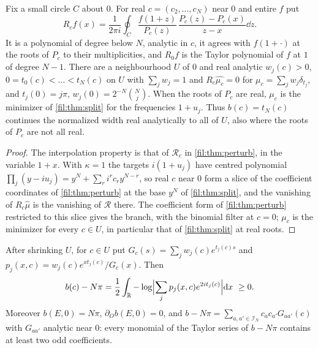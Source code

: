 \begin{lemma}\label{fil:lem:coeff}
Fix a small circle $C$ about $0$. For real $c=(c_2,\dots,c_N)$ near $0$ and entire $f$ put
\[
 R_cf(x)=\frac1{2\pi i}\oint_C\frac{f(1+z)}{P_c(z)}\,\frac{P_c(z)-P_c(x)}{z-x}\dd z .
\]
It is a polynomial of degree below $N$, analytic in $c$, it agrees with $f(1+\cdot)$ at the roots of $P_c$ to
their multiplicities, and $R_0f$ is the Taylor polynomial of $f$ at $1$ of degree $N-1$. There are a
neighbourhood $U$ of $0$ and real analytic $w_j(c)>0$, $0=t_0(c)<\dots<t_N(c)$ on $U$ with $\sum_jw_j=1$ and
$R_c\widehat{\mu_c}=0$ for $\mu_c=\sum_jw_j\delta_{t_j}$, and $t_j(0)=j\pi$, $w_j(0)=2^{-N}\binom Nj$. When the roots of
$P_c$ are real, $\mu_c$ is the minimizer of \cref{fil:thm:split} for the frequencies $1+u_j$. Thus $b(c)=t_N(c)$
continues the normalized width real analytically to all of $U$, also where the roots of $P_c$ are not all real.
\end{lemma}

\begin{proof}
The interpolation property is that of $\mathcal R_c$ in \cref{fil:thm:perturb}, in the variable $1+x$. With $\kappa=1$ the
targets $i(1+u_j)$ have centred polynomial $\prod_j(y-iu_j)=y^N+\sum_ri^rc_ry^{N-r}$, so real $c$ near $0$ form a slice
of the coefficient coordinates of \cref{fil:thm:perturb} at the base $y^N$ of \cref{fil:thm:split}, and the vanishing
of $R_c\widehat\mu$ is the vanishing of $\mathcal R$ there. The coefficient form of \cref{fil:thm:perturb} restricted to
this slice gives the branch, with the binomial filter at $c=0$; $\mu_c$ is the minimizer for every $c\in U$, in
particular that of \cref{fil:thm:split} at real roots.
\end{proof}

\begin{lemma}\label{fil:lem:defect}
After shrinking $U$, for $c\in U$ put $G_c(s)=\sum_jw_j(c)e^{t_j(c)s}$ and $p_j(x,c)=w_j(c)e^{xt_j(c)}/G_c(x)$. Then
\begin{equation}\label{fil:eq:defect}
 b(c)-N\pi=\frac12\int_{\mathbb{R}}-\log\Bigl\lvert\sum_jp_j(x,c)e^{2it_j(c)}\Bigr\rvert\mathrm{d} x\ \ge0 .
\end{equation}
Moreover $b(E,0)=N\pi$, $\partial_Ob(E,0)=0$, and $b-N\pi=\sum_{a,a'\in\mathcal I_N}c_ac_{a'}G_{aa'}(c)$ with $G_{aa'}$ analytic
near $0$: every monomial of the Taylor series of $b-N\pi$ contains at least two odd coefficients.
\end{lemma}

